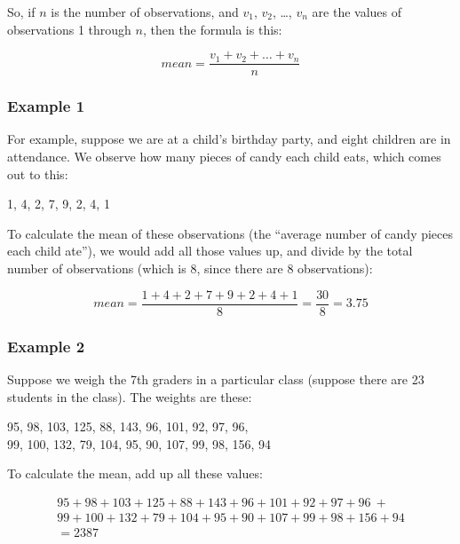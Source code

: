 \documentclass[../../../main.tex]{subfiles}
\begin{document}
So, if $n$ is the number of observations, and $v_{1}$, $v_{2}$, \ldots, $v_{n}$ are the values of observations 1 through $n$, then the formula is this:

\begin{equation*}
  mean = \frac{v_{1} + v_{2} + \ldots + v_{n}}{n}
\end{equation*}


\subsubsection{Example 1}

For example, suppose we are at a child's birthday party, and eight children are in attendance. We observe how many pieces of candy each child eats, which comes out to this:

\begin{center}
  1, 4, 2, 7, 9, 2, 4, 1
\end{center}

\noindent
To calculate the mean of these observations (the ``average number of candy pieces each child ate''), we would add all those values up, and divide by the total number of observations (which is 8, since there are 8 observations):

\begin{equation*}
  mean = \frac{1 + 4 + 2 + 7 + 9 + 2 + 4 + 1}{8} = \frac{30}{8} = 3.75
\end{equation*}


\subsubsection{Example 2}

Suppose we weigh the 7th graders in a particular class (suppose there are 23 students in the class). The weights are these:

\begin{center}
  95, 98, 103, 125, 88, 143, 96, 101, 92, 97, 96, \\
  99, 100, 132, 79, 104, 95, 90, 107, 99, 98, 156, 94
\end{center}

\noindent
To calculate the mean, add up all these values: 

\begin{multline*}
  95 + 98 + 103 + 125 + 88 + 143 + 96 + 101 + 92 + 97 + 96~+ \\
  99 + 100 + 132 + 79 + 104 + 95 + 90 + 107 + 99 + 98 + 156 + 94 \\
  = 2387
\end{multline*}
\end{document}
